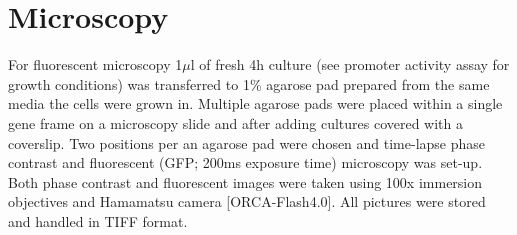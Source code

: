 \section{Microscopy}
For fluorescent microscopy 1$\mu$l of fresh 4h culture (see promoter activity assay for growth conditions) was transferred to 1\% agarose pad prepared from the same media the cells were grown in.
Multiple agarose pads were placed within a single gene frame on a microscopy slide and after adding cultures covered with a coverslip.
Two positions per an agarose pad were chosen and time-lapse phase contrast and fluorescent (GFP; 200ms exposure time) microscopy was set-up.
Both phase contrast and fluorescent images were taken using 100x immersion objectives and Hamamatsu camera [ORCA-Flash4.0].
All pictures were stored and handled in TIFF format.

\shorthandon{-} 
